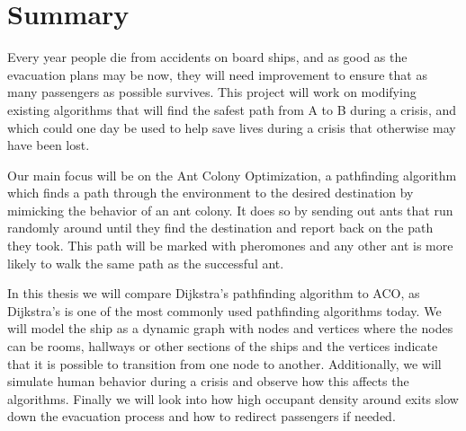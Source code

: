 \chapter{Summary}
\label{ch:summary}


Every year people die from accidents on board ships, and as good as the evacuation plans may be now, they will need improvement to ensure that as many passengers as possible survives. This project will work on modifying existing algorithms that will find the safest path from A to B during a crisis, and which could one day be used to help save lives during a crisis that otherwise may have been lost. 

Our main focus will be on the Ant Colony Optimization, a pathfinding algorithm which finds a path through the environment to the desired destination by mimicking the behavior of an ant colony. It does so by sending out ants that run randomly around until they find the destination and report back on the path they took. This path will be marked with pheromones and any other ant is more likely to walk the same path as the successful ant. 

In this thesis we will compare Dijkstra's pathfinding algorithm to ACO, as Dijkstra's is one of the most commonly used pathfinding algorithms today. We will model the ship as a dynamic graph with nodes and vertices where the nodes can be rooms, hallways or other sections of the ships and the vertices indicate that it is possible to transition from one node to another. Additionally, we will simulate human behavior during a crisis and observe how this affects the algorithms. Finally we will look into how high occupant density around exits slow down the evacuation process and how to redirect passengers if needed.